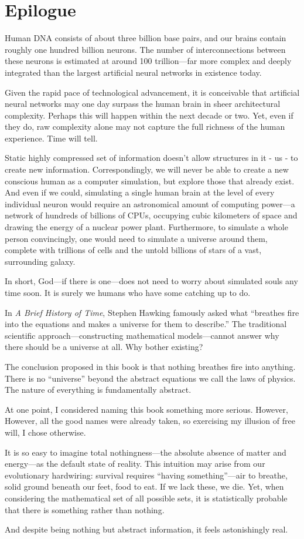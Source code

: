 \chapter{Epilogue}
\label{chap:epilogue}

Human DNA consists of about three billion base pairs, and our brains contain roughly one hundred billion neurons.
The number of interconnections between these neurons is estimated at around 100 trillion---far more complex and deeply integrated than the largest artificial neural networks in existence today.

Given the rapid pace of technological advancement, it is conceivable that artificial neural networks may one day surpass the human brain in sheer architectural complexity.
Perhaps this will happen within the next decade or two.
Yet, even if they do, raw complexity alone may not capture the full richness of the human experience.
Time will tell.

Static highly compressed set of information doesn't allow structures in it - us - to create new information.
Correspondingly, we will never be able to create a new conscious human as a computer simulation,
but explore those that already exist.
And even if we could, simulating a single human brain at the level of every individual neuron would require an astronomical amount of computing power---a network of hundreds of billions of CPUs, occupying cubic kilometers of space and drawing the energy of a nuclear power plant.
Furthermore, to simulate a whole person convincingly, one would need to simulate a universe around them, complete with trillions of cells and the untold billions of stars of a vast, surrounding galaxy.

In short, God---if there is one---does not need to worry about simulated souls any time soon.
It is surely we humans who have some catching up to do.

In \textit{A Brief History of Time}, Stephen Hawking famously asked what ``breathes fire into the equations and makes a universe for them to describe.''
The traditional scientific approach---constructing mathematical models---cannot answer why there should be a universe at all.
Why bother existing?

The conclusion proposed in this book is that nothing breathes fire into anything.
There is no ``universe'' beyond the abstract equations we call the laws of physics.
The nature of everything is fundamentally abstract.

At one point, I considered naming this book something more serious. However, 
However, all the good names were already taken, so exercising my illusion of free will, I chose otherwise.

It is so easy to imagine total nothingness---the absolute absence of matter and energy---as the default state of reality.
This intuition may arise from our evolutionary hardwiring: survival requires ``having something''---air to breathe, solid ground beneath our feet, food to eat.
If we lack these, we die.
Yet, when considering the mathematical set of all possible sets, it is statistically probable that there is something rather than nothing.

And despite being nothing but abstract information, it feels astonishingly real.
